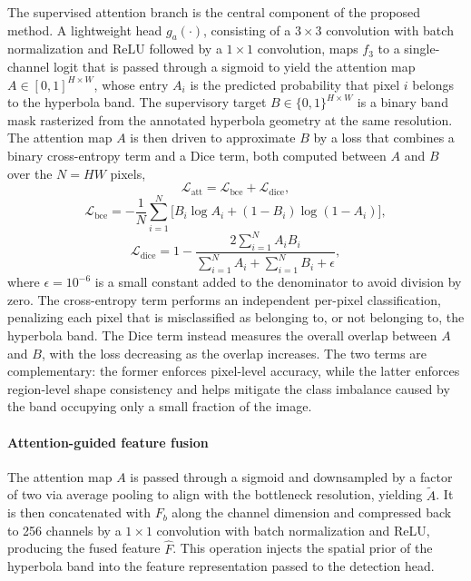 \documentclass[lettersize,journal]{IEEEtran}
\begin{document}
The supervised attention branch is the central component of the proposed method.
A lightweight head $g_a(\cdot)$, consisting of a $3\times3$ convolution with
batch normalization and ReLU followed by a $1\times1$ convolution, maps $f_3$ to
a single-channel logit that is passed through a sigmoid to yield the attention
map $A\in[0,1]^{H\times W}$, whose entry $A_i$ is the predicted probability that
pixel $i$ belongs to the hyperbola band. The supervisory target
$B\in\{0,1\}^{H\times W}$ is a binary band mask rasterized from the annotated
hyperbola geometry at the same resolution. The attention map $A$ is then driven
to approximate $B$ by a loss that combines a binary cross-entropy term and a
Dice term, both computed between $A$ and $B$ over the $N=HW$ pixels,
\begin{equation}
\mathcal{L}_{\mathrm{att}} = \mathcal{L}_{\mathrm{bce}} + \mathcal{L}_{\mathrm{dice}},
\end{equation}
\begin{equation}
\mathcal{L}_{\mathrm{bce}} = -\frac{1}{N}\sum_{i=1}^{N}\Big[B_i\log A_i + (1-B_i)\log(1-A_i)\Big],
\end{equation}
\begin{equation}
\mathcal{L}_{\mathrm{dice}} = 1 - \frac{2\sum_{i=1}^{N} A_i B_i}{\sum_{i=1}^{N} A_i + \sum_{i=1}^{N} B_i + \epsilon},
\end{equation}
where $\epsilon=10^{-6}$ is a small constant added to the denominator to avoid
division by zero. The cross-entropy term performs an independent per-pixel
classification, penalizing each pixel that is misclassified as belonging to, or
not belonging to, the hyperbola band. The Dice term instead measures the overall
overlap between $A$ and $B$, with the loss decreasing as the overlap increases.
The two terms are complementary: the former enforces pixel-level accuracy, while
the latter enforces region-level shape consistency and helps mitigate the class
imbalance caused by the band occupying only a small fraction of the image.

\paragraph{Attention-guided feature fusion}
The attention map $A$ is passed through a sigmoid and downsampled by a factor of
two via average pooling to align with the bottleneck resolution, yielding
$\tilde{A}$. It is then concatenated with $F_b$ along the channel dimension and
compressed back to 256 channels by a $1\times1$ convolution with batch
normalization and ReLU, producing the fused feature $\hat{F}$. This operation
injects the spatial prior of the hyperbola band into the feature representation
passed to the detection head.
\end{document}
